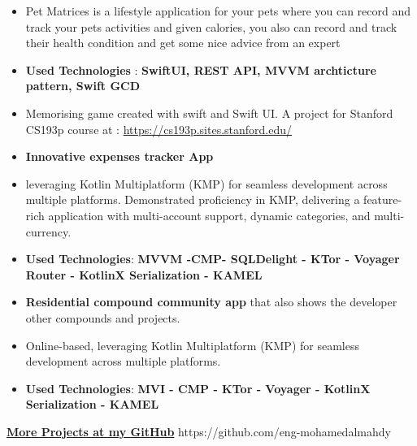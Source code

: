 \documentclass[10pt,a4paper,ragged2e,withhyper]{altacv}
\begin{document}
    \hypertarget{pet_materices}{}
    \begin{itemize}
        \item \textbf{}Pet Matrices is a lifestyle application for your pets where you can record and track your pets activities and given calories, you also can record and track their health condition and get some nice advice from an expert
        \item \textbf{Used Technologies} : \textbf{SwiftUI, REST API, MVVM archticture pattern, Swift GCD}
    \end{itemize}
    \divider

    \begin{itemize}
        \item \textbf{} Memorising game created with swift and Swift UI. \linebreak
        A project for Stanford CS193p course at : \href{https://cs193p.sites.stanford.edu/}{https://cs193p.sites.stanford.edu/}
    \end{itemize}
    \divider


    \vspace{6px}
    \vspace{2px}

    \begin{itemize}
        \item \textbf{Innovative expenses tracker App}
        \item leveraging Kotlin Multiplatform (KMP) for seamless development across multiple platforms.
        Demonstrated proficiency in KMP,
        delivering a feature-rich application with multi-account support, dynamic categories, and multi-currency.
        \item \textbf{Used Technologies}: \textbf{MVVM -CMP- SQLDelight - KTor - Voyager Router - KotlinX Serialization - KAMEL}
    \end{itemize}
    \divider

    \begin{itemize}
        \item \textbf{Residential compound community app} that also shows the developer other compounds and projects.
        \item Online-based, leveraging Kotlin Multiplatform (KMP) for seamless development across multiple platforms.
        \item \textbf{Used Technologies}: \textbf{MVI - CMP - KTor - Voyager - KotlinX Serialization - KAMEL}
    \end{itemize}
    \divider

    \begin{center}
        \textbf{\Large \href{https://github.com/eng-mohamedalmahdy}{More Projects at my GitHub}}
        {\cvrepo{\color{GitHubColor}\faGithub}
        {https://github.com/eng-mohamedalmahdy}}{}{}
    \end{center}
    \divider
\end{document}
